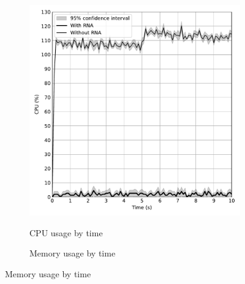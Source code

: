 
\begin{figure}[htb]
    \caption{RNA Performance Evaluation}
    \begin{subfigure}{.5\textwidth}
        \centering
        \vspace{1em}
        \caption{CPU usage by time}
        \includegraphics[width=1.0\textwidth]{images/aggregated_cpu_plot.pdf}
        \label{fig:rna_cpu}
    \end{subfigure}%
    \begin{subfigure}{.5\textwidth}
        \centering
        \vspace{1em}
        \caption{Memory usage by time}

\end{subfigure}
\end{figure}
